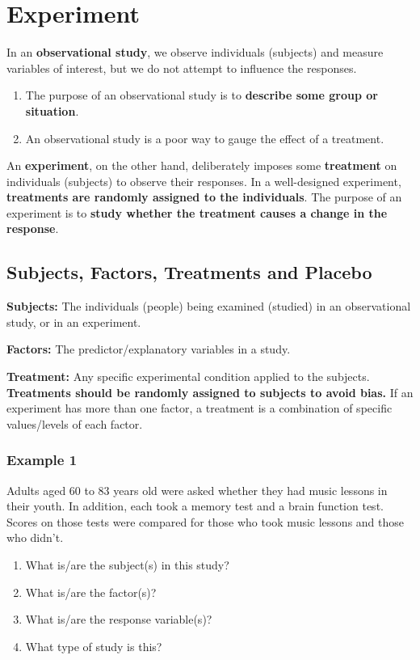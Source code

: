 \chapter{Experiment}

In an \textbf{observational study}, we observe individuals (subjects) and measure variables of interest, but we do not attempt to influence the responses.

\begin{enumerate}
    \item The purpose of an observational study is to \textbf{describe some group or situation}.
    \item An observational study is a poor way to gauge the effect of a treatment.
\end{enumerate}

An \textbf{experiment}, on the other hand, deliberately imposes some \textbf{treatment} on individuals (subjects) to observe their responses. In a well-designed experiment, \textbf{treatments are randomly assigned to the individuals}. The purpose of an experiment is to \textbf{study whether the treatment causes a change in the response}.

\section{Subjects, Factors, Treatments and Placebo}

\textbf{Subjects:} The individuals (people) being examined (studied) in an observational study, or in an experiment.

\textbf{Factors:} The predictor/explanatory variables in a study.

\textbf{Treatment:} Any specific experimental condition applied to the subjects. \textbf{Treatments should be randomly assigned to subjects to avoid bias.} If an experiment has more than one factor, a treatment is a combination of specific values/levels of each factor.

\subsection*{Example 1}

Adults aged 60 to 83 years old were asked whether they had music lessons in their youth. In addition, each took a memory test and a brain function test. Scores on those tests were compared for those who took music lessons and those who didn't.

\begin{enumerate}
    \item What is/are the subject(s) in this study?
    \item What is/are the factor(s)?
    \item What is/are the response variable(s)?
    \item What type of study is this?
\end{enumerate}

